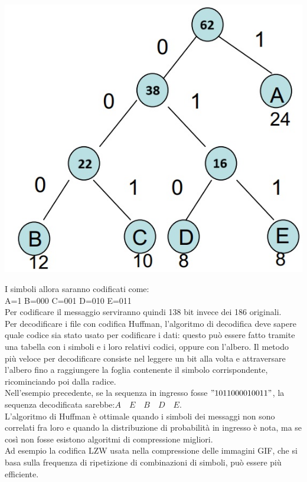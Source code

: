 \documentclass[a4paper,11pt]{article} %
\begin{document}
\begin{minipage}{0.3\textwidth}
\centering
    \includegraphics[width=\linewidth]{HuffmanTree}
\end{minipage}
I simboli allora saranno codificati come: \\
A=1 \quad B=000 \quad C=001 \quad D=010 \quad E=011\\
Per codificare il messaggio serviranno quindi 138 bit invece dei 186 originali.\\
Per decodificare i file con codifica Huffman, l'algoritmo di decodifica deve sapere quale codice sia stato usato per codificare i dati: questo può essere fatto tramite una tabella con i simboli e i loro relativi codici, oppure con l'albero. Il metodo più veloce per decodificare consiste nel leggere un bit alla volta e attraversare l'albero fino a raggiungere la foglia contenente il simbolo corrispondente, ricominciando poi dalla radice.\\
Nell'esempio precedente, se la sequenza in ingresso fosse $"1011000010011"$, la sequenza decodificata sarebbe:\quad $A \quad E \quad B \quad D \quad E$.\\
L'algoritmo di Huffman è ottimale quando i simboli dei messaggi non sono correlati fra loro e quando la distribuzione di probabilità in ingresso è nota, ma se così non fosse esistono algoritmi di compressione migliori. \\
Ad esempio la codifica LZW usata nella compressione delle immagini GIF, che si basa sulla frequenza di ripetizione di combinazioni di simboli, può essere più efficiente. 
\end{document}
